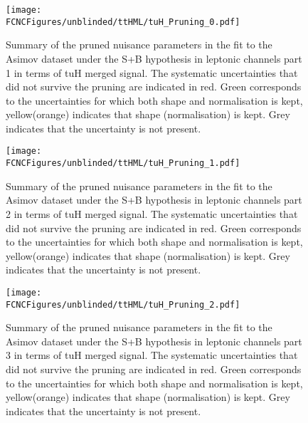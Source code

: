 \begin{figure}[htb]
\centering
\texttt{[image: \\FCNCFigures/unblinded/ttHML/tuH\_Pruning\_0.pdf]}
\caption{ Summary of the pruned nuisance parameters in the fit to the  Asimov dataset under the S+B hypothesis in leptonic channels part 1 in terms of tuH merged signal. The systematic uncertainties that did not survive the pruning are indicated in red. Green corresponds to the uncertainties for which both shape and normalisation is kept, yellow(orange) indicates that shape (normalisation) is kept. Grey indicates that the uncertainty is not present.}
\label{fig:tthML_pruning_0}
\end{figure}

\begin{figure}[htb]
\centering
\texttt{[image: \\FCNCFigures/unblinded/ttHML/tuH\_Pruning\_1.pdf]}
\caption{ Summary of the pruned nuisance parameters in the fit to the  Asimov dataset under the S+B hypothesis in leptonic channels part 2 in terms of tuH merged signal. The systematic uncertainties that did not survive the pruning are indicated in red. Green corresponds to the uncertainties for which both shape and normalisation is kept, yellow(orange) indicates that shape (normalisation) is kept. Grey indicates that the uncertainty is not present. }
\label{fig:tthML_pruning_1}
\end{figure}

\begin{figure}[htb]
\centering
\texttt{[image: \\FCNCFigures/unblinded/ttHML/tuH\_Pruning\_2.pdf]}
\caption{ Summary of the pruned nuisance parameters in the fit to the  Asimov dataset under the S+B hypothesis in leptonic channels part 3 in terms of tuH merged signal. The systematic uncertainties that did not survive the pruning are indicated in red. Green corresponds to the uncertainties for which both shape and normalisation is kept, yellow(orange) indicates that shape (normalisation) is kept. Grey indicates that the uncertainty is not present.}
\label{fig:tthML_pruning_2}
\end{figure}


